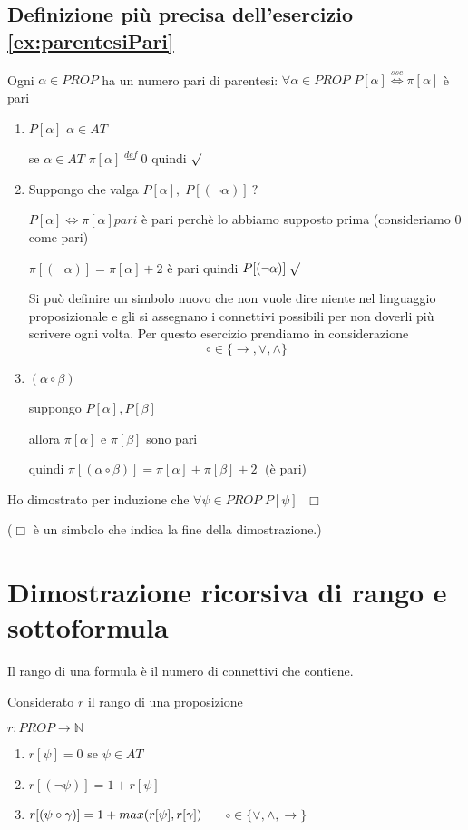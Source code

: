 \documentclass{article}
\theoremstyle{break}
\theoremstyle{break}
\theoremstyle{break}
\theoremstyle{break}
\begin{document}
\subsection{Definizione più precisa dell'esercizio \ref{ex:parentesiPari}}
Ogni \( \alpha \in PROP \) ha un numero pari di parentesi: \( \forall \alpha \in PROP \) \( P[\alpha] \stackrel{sse}{\Leftrightarrow} \pi[\alpha] \) è pari
\begin{enumerate}
	\item \( P[\alpha ] \) \( \alpha \in AT \)

	      se \( \alpha \in AT \! \) \( \pi[\alpha]\stackrel{def}{=}0 \) quindi \( \surd \)
	\item Suppongo che valga \( P[\alpha ],\; P[(\neg \alpha )] \: ? \)

	      \( P[\alpha ] \Leftrightarrow \pi[\alpha ] pari \) è pari perchè lo abbiamo supposto prima (consideriamo 0 come pari)


	      \( \pi[(\neg \alpha )] = \pi [\alpha ] + 2 \) è pari quindi \( P[(\neg \alpha )] \; \surd \)

	      Si può definire un simbolo nuovo che non vuole dire niente nel linguaggio proposizionale e
	      gli si assegnano i connettivi possibili per non doverli più scrivere ogni volta.
	      Per questo esercizio prendiamo in considerazione \[ \circ \in \{\to , \vee, \wedge\} \]

	\item \( (\alpha \circ \beta) \)

	      suppongo \( P[\alpha ], P[\beta ] \)

	      allora \( \pi[\alpha ] \) e \( \pi[\beta ] \) sono pari

	      quindi \( \pi[(\alpha \circ \beta )] = \pi[\alpha ] + \pi[\beta ] + 2 \;\) (è pari)

\end{enumerate}

Ho dimostrato per induzione che \( \forall \psi \in PROP \; P[\psi] \; \) \( \Box \)

(\( \Box \) è un simbolo che indica la fine della dimostrazione.)

\section{Dimostrazione ricorsiva di rango e sottoformula}
Il rango di una formula è il numero di connettivi che contiene.
\begin{definition}
	Considerato \( r \) il rango di una proposizione

	\( r: PROP \to \mathbb{N} \)

	\begin{enumerate}
		\item \( r[\psi] = 0 \) se \( \psi \in AT \)
		\item \( r[(\neg \psi)] = 1 + r[\psi] \)
		\item \( r[(\psi \circ \gamma )] = 1 + max(r[\psi], r[\gamma]) \hspace{5mm} \) \( \circ \in \{\vee, \wedge, \to \} \)

	\end{enumerate}
\end{definition}
\end{document}
